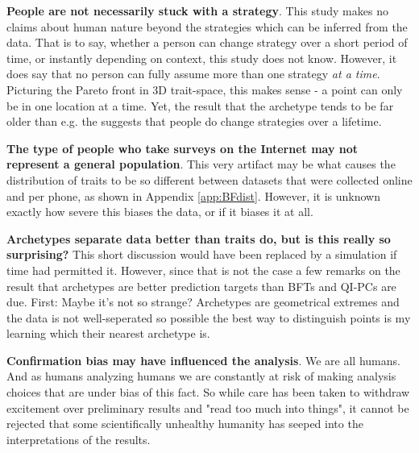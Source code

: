 \textbf{People are not necessarily stuck with a strategy}.
This study makes no claims about human nature beyond the strategies which can be inferred from the data. That is to say, whether a person can change strategy over a short period of time, or instantly depending on context, this study does not know. However, it does say that no person can fully assume more than one strategy \textit{at a time}. Picturing the Pareto front in 3D trait-space, this makes sense - a point can only be in one location at a time. Yet, the result that the \wildcard archetype tends to be far older than e.g. the \hippie suggests that people do change strategies over a lifetime.


\textbf{The type of people who take surveys on the Internet may not represent a general population}.
This very artifact may be what causes the distribution of traits to be so different between datasets that were collected online and per phone, as shown in Appendix \ref{app:BFdist}. However, it is unknown exactly how severe this biases the data, or if it biases it at all.

\textbf{Archetypes separate data better than traits do, but is this really so surprising?}
This short discussion would have been replaced by a simulation if time had permitted it. However, since that is not the case a few remarks on the result that archetypes are better prediction targets than BFTs and QI-PCs are due. First: Maybe it's not so strange? Archetypes are geometrical extremes and the data is not well-seperated so possible the best way to distinguish points is my learning which their nearest archetype is.

\textbf{Confirmation bias may have influenced the analysis}.
We are all humans. And as humans analyzing humans we are constantly at risk of making analysis choices that are under bias of this fact. So while care has been taken to withdraw excitement over preliminary results and "read too much into things", it cannot be rejected that some scientifically unhealthy humanity has seeped into the interpretations of the results.